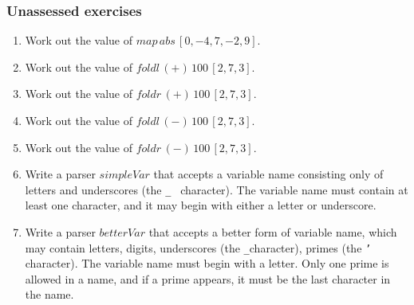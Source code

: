 \documentclass{beamer}
\begin{document}
\begin{frame}[fragile]
\frametitle{Unassessed exercises}

\begin{enumerate}

\item Work out the value of $map\, abs\, [0, -4, 7, -2, 9]$.

\item Work out the value of $foldl\, (+)\, 100\, [2,7,3]$.

\item Work out the value of $foldr\, (+)\, 100\, [2,7,3]$.

\item Work out the value of $foldl\, (-)\, 100\, [2,7,3]$.

\item Work out the value of $foldr\, (-)\, 100\, [2,7,3]$.

\item Write a parser $simpleVar$ that accepts a variable name
  consisting only of letters and underscores (the {\tt \_ } character).
  The variable name must contain at least one character, and it may
  begin with either a letter or underscore.

\item Write a parser $betterVar$ that accepts a better form of
  variable name, which may contain letters, digits, underscores
  (the {\tt \_}character), primes (the {\tt '} character).
  The variable name must begin with a letter.  Only one prime is
  allowed in a name, and if a prime appears, it must be the last
  character in the name.
\end{enumerate}

\end{frame}
\end{document}
